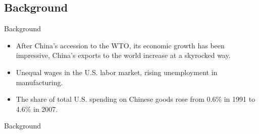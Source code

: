 \documentclass[10pt,aspectratio=43,mathserif,table]{beamer}
\begin{document}
\subsection{Background}
\begin{frame}{Background}
		\begin{itemize}
			\item<0->  After China's accession to the WTO, its economic growth has been impressive, China's exports to the world increase at a skyrocked way.
			\item<0->  Unequal wages in the U.S. labor market, rising unemployment in manufacturing.
			\item<0->  The share of total U.S. spending on Chinese goods rose from 0.6\% in 1991 to 4.6\% in 2007.
		\end{itemize}
\end{frame}
\begin{frame}{Background}
	\begin{figure}[thpb]
		\centering
	\end{figure}
\end{frame}
\end{document}

